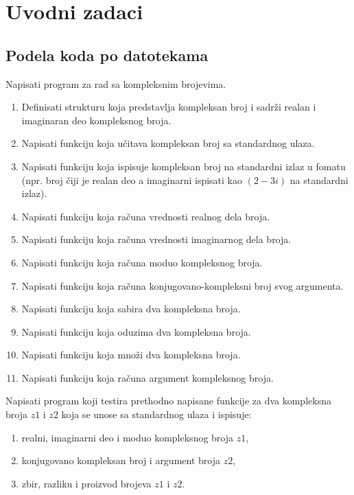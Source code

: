 \chapter{Uvodni zadaci}

\section{Podela koda po datotekama}

\begin{Exercise}[label=001] %
Napisati program za rad sa kompleksnim brojevima.
\begin{enumerate}
\item Definisati strukturu  koja predstavlja kompleksan broj i sadrži realan i imaginaran deo kompleksnog broja.
\item Napisati funkciju  koja učitava kompleksan broj sa standardnog ulaza.
\item Napisati funkciju  koja ispisuje kompleksan broj na standardni izlaz u fomatu (npr. broj čiji je realan deo  a imaginarni  ispisati kao $(2-3i)$ na standardni izlaz).
\item Napisati funkciju  koja računa vrednosti realnog dela broja.
\item Napisati funkciju  koja računa vrednosti imaginarnog dela broja.
\item Napisati funkciju  koja računa moduo kompleksnog broja.
\item Napisati funkciju  koja računa konjugovano-kompleksni broj svog argumenta.
\item Napisati funkciju  koja sabira dva kompleksna broja.
\item Napisati funkciju  koja oduzima dva kompleksna broja.
\item Napisati funkciju  koja množi dva kompleksna broja.
\item Napisati funkciju  koja računa argument kompleksnog broja.
\end{enumerate}
Napisati program koji testira prethodno napisane funkcije za dva kompleksna broja $z1$ i $z2$ koja se unose sa standardnog ulaza i ispisuje:
\begin{enumerate}
\item realni, imaginarni deo i moduo kompleksnog broja $z1$,
\item konjugovano kompleksan broj i argument broja $z2$,
\item zbir, razliku i proizvod brojeva $z1$ i $z2$.
\end{enumerate}


\end{Exercise}
